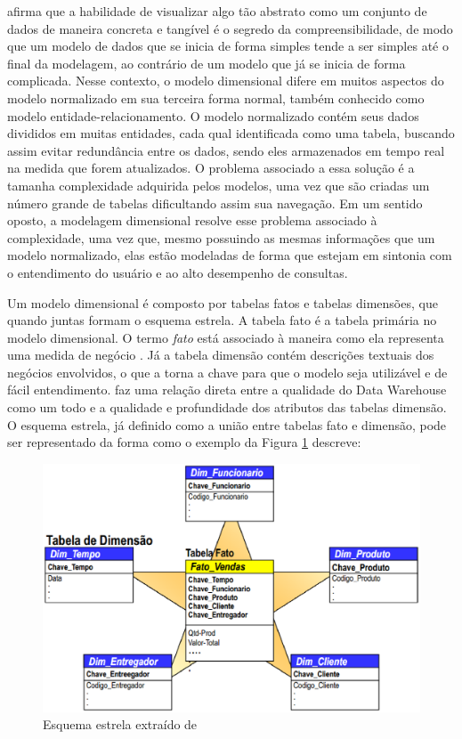  afirma que a habilidade de visualizar algo tão abstrato como um conjunto de dados  de maneira concreta e tangível é o segredo da compreensibilidade, de modo que um modelo de dados que se inicia de forma simples tende a ser simples até o final da modelagem, ao contrário de um modelo que já se inicia de forma complicada. Nesse contexto, o modelo dimensional difere em muitos aspectos do modelo normalizado em sua terceira forma normal, também conhecido como modelo entidade-relacionamento. O modelo normalizado contém seus dados divididos em muitas entidades, cada qual identificada como uma tabela, buscando assim evitar redundância entre os dados, sendo eles armazenados em tempo real na medida que forem atualizados. O problema associado a essa solução é a tamanha complexidade adquirida pelos modelos, uma vez que são criadas um número grande de tabelas dificultando assim sua navegação. Em um sentido oposto, a modelagem dimensional resolve esse problema associado à complexidade, uma vez que, mesmo possuindo as mesmas informações que um modelo normalizado, elas estão modeladas de forma que estejam em sintonia com o entendimento do usuário e ao alto desempenho de consultas. 

Um modelo dimensional é composto por tabelas fatos e tabelas dimensões, que quando juntas formam o esquema estrela. A tabela fato é a tabela primária no modelo dimensional. O termo \textit{fato} está associado à maneira como ela representa uma medida de negócio \cite{Kimball2002}. Já a tabela dimensão contém descrições textuais dos negócios envolvidos, o que a torna a chave para que o modelo seja utilizável e de fácil entendimento.  faz uma relação direta entre a qualidade do Data Warehouse como um todo e a qualidade e profundidade dos atributos das tabelas dimensão. O esquema estrela, já definido como a união entre tabelas fato e dimensão, pode ser representado da forma como o exemplo da Figura \ref{fig:estrela} descreve:
 
\begin{figure}[h!]
\centering
\includegraphics[keepaspectratio=false,scale=0.50]{figuras/figuras_matheus/star.eps}
\caption{Esquema estrela extraído de }
\label{fig:estrela}
\end{figure}
\FloatBarrier
 

